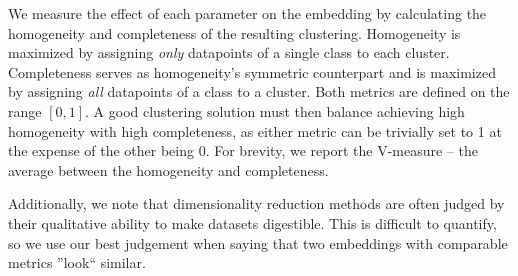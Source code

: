 \documentclass[sigconf, nonacm]{acmart}
\begin{document}
We measure the effect of each parameter on the embedding by calculating the homogeneity and completeness \cite{rosenberg2007v} of the resulting clustering.
Homogeneity is maximized by assigning \textit{only} datapoints of a single class to each cluster.
Completeness serves as homogeneity's symmetric counterpart and is maximized by assigning \textit{all} datapoints of a class to a cluster.
Both metrics are defined on the range $[0, 1]$.
A good clustering solution must then balance achieving high homogeneity with high completeness, as either metric can be trivially set to 1 at the expense of the
other being 0. For brevity, we report the V-measure -- the average between the homogeneity and completeness.

Additionally, we note that dimensionality reduction methods are often judged by their qualitative ability to make datasets digestible. This is difficult to
quantify, so we use our best judgement when saying that two embeddings with comparable metrics ''look`` similar.
\end{document}
